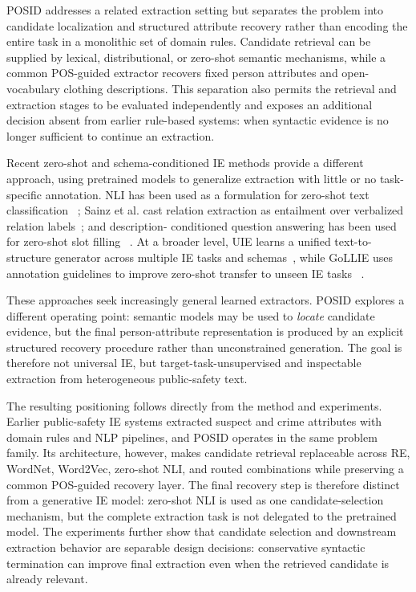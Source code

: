 \documentclass[sigconf,nonacm]{acmart}
\newcommand{\posid}{\textsc{POSID}}
\begin{document}
\posid{} addresses a related extraction setting but separates the problem into
candidate localization and structured attribute recovery rather than encoding
the entire task in a monolithic set of domain rules. Candidate retrieval can be
supplied by lexical, distributional, or zero-shot semantic mechanisms, while a
common POS-guided extractor recovers fixed person attributes and open-vocabulary
clothing descriptions. This separation also permits the retrieval and extraction
stages to be evaluated independently and exposes an additional decision absent
from earlier rule-based systems: when syntactic evidence is no longer sufficient
to continue an extraction.

Recent zero-shot and schema-conditioned IE methods provide a different
approach, using pretrained models to generalize extraction with little or no
task-specific annotation. NLI has been used as a formulation for zero-shot text
classification
~\cite{yin2019benchmarking}; Sainz et al. cast relation extraction as entailment
over verbalized relation labels~\cite{sainz2021entailment}; and description-
conditioned question answering has been used for zero-shot slot filling
~\cite{du2021qasf}. At a broader level, UIE learns a unified text-to-structure
generator across multiple IE tasks and schemas~\cite{lu2022uie}, while GoLLIE
uses annotation guidelines to improve zero-shot transfer to unseen IE tasks
~\cite{sainz2024gollie}.

These approaches seek increasingly general learned extractors. \posid{} explores
a different operating point: semantic models may be used to \emph{locate}
candidate evidence, but the final person-attribute representation is produced
by an explicit structured recovery procedure rather than unconstrained
generation. The goal is therefore not universal IE, but target-task-unsupervised
and inspectable extraction from heterogeneous public-safety text.

The resulting positioning follows directly from the method and experiments.
Earlier public-safety IE systems extracted suspect and crime attributes with
domain rules and NLP pipelines, and \posid{} operates in the same problem
family. Its architecture, however, makes candidate retrieval replaceable across
RE, WordNet, Word2Vec, zero-shot NLI, and routed combinations while preserving a
common POS-guided recovery layer. The final recovery step is therefore distinct
from a generative IE model: zero-shot NLI is used as one candidate-selection
mechanism, but the complete extraction task is not delegated to the pretrained
model. The experiments further show that candidate selection and downstream
extraction behavior are separable design decisions: conservative syntactic
termination can improve final extraction even when the retrieved candidate is
already relevant.
\end{document}
